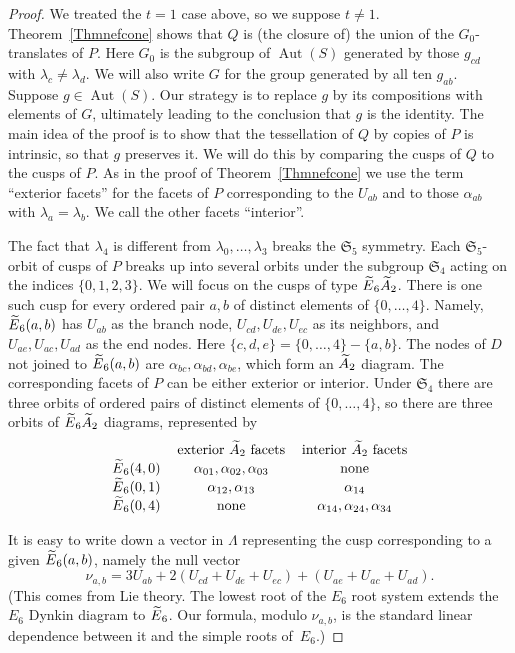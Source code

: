 \documentclass[11pt]{article}
\theoremstyle{definition}
\numberwithin{equation}{section}
\numberwithin{figure}{section}
\numberwithin{table}{section}
\let\oldtilde\tilde
\renewcommand*\tilde[1]{\mathchoice{\widetilde{#1}}{\widetilde{#1}}{\oldtilde{#1}}{\oldtilde{#1}}}
\newcommand*\Atilde{\tilde A}
\newcommand*\Etilde{\tilde E}
\DeclareMathOperator{\Aut}{Aut}
\newcommand{\frakS}{\mathfrak{S}}
\begin{document}
\begin{proof}
We treated the $t=1$ case above, so we suppose $t\neq1$. Theorem~\ref{Thmnefcone} shows that $Q$ is (the closure of) the union of the $G_0$-translates of $P$. Here $G_0$ is the subgroup of $\Aut(S)$ generated by those $g_{cd}$ with $\lambda_c\neq\lambda_d$. We will also write $G$ for the group generated by all ten $g_{ab}$. Suppose $g\in\Aut(S)$. Our strategy is to replace $g$ by its compositions with elements of $G$, ultimately leading to the conclusion that $g$ is the identity. The main idea of the proof is to show that the tessellation of $Q$ by copies of $P$ is intrinsic, so that $g$ preserves it. We will do this by comparing the cusps of $Q$ to the cusps of $P$. As in the proof of Theorem~\ref{Thmnefcone} we use the term ``exterior facets'' for the facets of $P$ corresponding to the $U_{ab}$ and to those $\alpha_{ab}$ with $\lambda_a=\lambda_b$. We call the other facets ``interior''.

The fact that $\lambda_4$ is different from $\lambda_0,\dots,\lambda_3$ breaks the $\frakS_5$ symmetry. Each $\frakS_5$-orbit of cusps of $P$ breaks up into several orbits under the subgroup $\frakS_4$ acting on the indices $\{0,1,2,3\}$. We will focus on the cusps of type $\Etilde_6\Atilde_2$. There is one such cusp for every ordered pair $a,b$ of distinct elements of $\{0,\dots,4\}$. Namely, $\Etilde_6(a,b)$ has $U_{ab}$ as the branch node, $U_{cd},U_{de},U_{ec}$ as its neighbors, and $U_{ae},U_{ac},U_{ad}$ as the end nodes. Here $\{c,d,e\}=\{0,\dots,4\}-\{a,b\}$. The nodes of $D$ not joined to $\Etilde_6(a,b)$ are $\alpha_{bc},\alpha_{bd},\alpha_{be}$, which form an $\Atilde_2$ diagram. The corresponding facets of $P$ can be either exterior or interior. Under $\frakS_4$ there are three orbits of ordered pairs of distinct elements of $\{0,\dots,4\}$, so there are three orbits of $\Etilde_6\Atilde_2$ diagrams, represented by
\[
\begin{tabular}{ccc}
&exterior $\Atilde_2$ facets&interior $\Atilde_2$ facets
\\
$\Etilde_6(4,0)$&$\alpha_{01},\alpha_{02},\alpha_{03}$&none
\\
$\Etilde_6(0,1)$&$\alpha_{12},\alpha_{13}$&$\alpha_{14}$
\\
$\Etilde_6(0,4)$&none&$\alpha_{14},\alpha_{24},\alpha_{34}$
\end{tabular}
\] %

It is easy to write down a vector in $\Lambda$ representing the cusp corresponding to a given $\Etilde_6(a,b)$, namely the null vector
\begin{equation}\label{EqCusp}
\nu_{a,b}= 3 U_{ab} + 2(U_{cd}+U_{de}+U_{ec})+(U_{ae}+U_{ac}+U_{ad}).
\end{equation}
(This comes from Lie theory. The lowest root of the $E_6$ root system extends the $E_6$ Dynkin diagram to $\Etilde_6$. Our formula, modulo $\nu_{a,b}$, is the standard linear dependence between it and the simple roots of~$E_6$.)


\end{proof}
\end{document}
